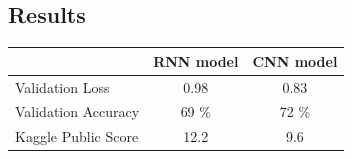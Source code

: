 \documentclass[12pt, a4paper]{article}
\begin{document}
		\subsection{Results}
			\begin{tabular}{|l|c|c|}
				\hline
									& RNN model & CNN model \\\hline
				Validation Loss		& 0.98 		& 0.83 		\\\hline 
				Validation Accuracy	& 69 \% 	& 72 \% 	\\\hline
				Kaggle Public Score & 12.2 		& 9.6 		\\\hline
			\end{tabular}\\\\
		
		
\end{document}
